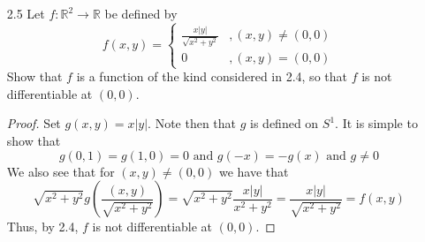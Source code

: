 \begin{enumerate}
\begin{proof}
\begin{enumerate}
    \item Suppose that \( Df(0,0) \) exists. Then there is \( \lambda \in \mathcal{L}(\mathbb{R}^2, \mathbb{R}) \) such that
    \begin{align*}
    0 &= \lim_{(h,k) \rightarrow (0,0)} \frac{\left| f(h,k) - f(0,0) - \lambda(h,k) \right|}{\left| (h,k) \right|} \\
    &= \lim_{(h,k) \rightarrow (0,0)} \frac{\left| f(h,k) - \lambda(h,k) \right|}{\left| (h,k) \right|}
    \end{align*}
    Approaching along the \(x\)-axis and \(y\)-axis separately, along with the linearity of \( \lambda \), implies that \( \lambda (x,y) = 0 \). That is, that \( Df(0,0) = 0 \). Thus
    \begin{align*}
        0 &= \lim_{(h,k) \rightarrow (0,0)} \frac{\left| f(h,k) \right|}{\left| (h,k) \right|} \\
        &= \lim_{(h,k) \rightarrow (0,0)} \left| g\left( \frac{(h,k)}{\left| (h,k) \right|} \right) \right|
    \end{align*}
    Now, let \( \epsilon > 0 \) be given and let \( (x,y) \in S^1 \). For \(  \left| \alpha \right| > 0 \) small enough, we will have that
    \[
    \left| g(x,y) \right| = \left| g\left( \frac{\alpha (x,y)}{\left| \alpha \right| \left| (x,y) \right|} \right) \right| < \epsilon
    \]
    So \( \left| g(x,y) \right| < \epsilon \) for every \( \epsilon > 0 \). Thus \( g(x,y) = 0 \). Therefore \( g = 0 \).
    \end{enumerate}
    \end{proof}
    
    \emph{Note: Continuity of \( g \) was not needed in 2.4} 

    \item[2.5] Let \( f: \mathbb{R}^2 \rightarrow \mathbb{R} \) be defined by
    \[
    f(x,y) = \begin{cases} \frac{x\left|y\right|}{\sqrt{x^2+y^2}} & , (x,y) \neq (0,0) \\ 0 & , (x,y) = (0,0) \end{cases}
    \]
    Show that \( f \) is a function of the kind considered in 2.4, so that \( f \) is not differentiable at \( (0,0) \).
    
    \begin{proof}
    Set \( g(x,y) = x \left| y \right| \). Note then that \( g \) is defined on \( S^1 \). It is simple to show that
    \[
    g(0,1) = g(1,0) = 0 \text{ and } g(-x) = -g(x) \text{ and } g \neq 0
    \]
    We also see that for \( (x,y) \neq (0,0) \) we have that
    \[
    \sqrt{x^2 + y^2}g\left( \frac{(x,y)}{\sqrt{x^2+y^2}} \right) = \sqrt{x^2 + y^2} \frac{x \left| y \right|}{x^2+y^2} = \frac{x\left|y\right|}{\sqrt{x^2+y^2}} = f(x,y)
    \]
    Thus, by 2.4, \( f \) is not differentiable at \( (0,0) \). 
    \end{proof}
    

\end{enumerate}
